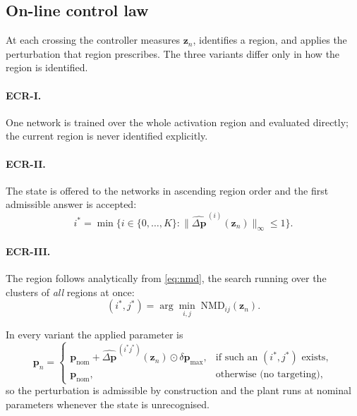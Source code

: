\subsection{On-line control law}
\label{subsec:ecr-online}

At each crossing the controller measures $\mathbf{z}_n$, identifies a region,
and applies the perturbation that region prescribes. The three variants differ
only in how the region is identified.

\paragraph{ECR-I.} One network is trained over the whole activation region and
evaluated directly; the current region is never identified explicitly.

\paragraph{ECR-II.} The state is offered to the networks in ascending region
order and the first admissible answer is accepted:
%
\begin{equation}
i^{*}=\min\bigl\{i\in\{0,\dots,K\}:\|\widehat{\Delta\mathbf{p}}^{\,(i)}(\mathbf{z}_n)\|_{\infty}\le1\bigr\}.
\label{eq:ecr2-law}
\end{equation}

\paragraph{ECR-III.} The region follows analytically from \eqref{eq:nmd}, the
search running over the clusters of \emph{all} regions at once:
%
\begin{equation}
(i^{*},j^{*})=\arg\min_{i,j}\;\mathrm{NMD}_{ij}(\mathbf{z}_n).
\label{eq:ecr3-law}
\end{equation}

In every variant the applied parameter is
%
\begin{equation}
\mathbf{p}_n=
\begin{cases}
\mathbf{p}_{\mathrm{nom}}+\widehat{\Delta\mathbf{p}}^{\,(i^{*}j^{*})}(\mathbf{z}_n)\odot\delta\mathbf{p}_{\max},
& \text{if such an } (i^{*},j^{*}) \text{ exists},\\[2pt]
\mathbf{p}_{\mathrm{nom}}, & \text{otherwise (no targeting)} ,
\end{cases}
\label{eq:control-law}
\end{equation}
%
so the perturbation is admissible by construction and the plant runs at nominal
parameters whenever the state is unrecognised.


